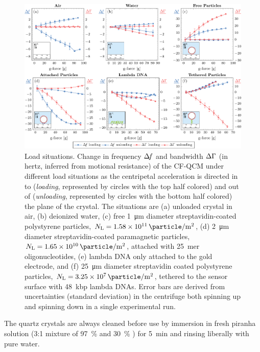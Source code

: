 \begin{figure}[ht]
\centering
\includegraphics[width=16cm,keepaspectratio]{qcm/figures/figure2.pdf}
\caption{Load situations.
Change in frequency $\Delta\!f$ and bandwidth $\Delta\Gamma$
(in hertz, inferred from motional resistance) of
the CF-QCM under different load situations as the centripetal acceleration
is directed in to (\textit{loading}, represented by circles with the top half
colored) and out of (\textit{unloading}, represented by circles with the
bottom half colored) the plane of the crystal.
The situations are
(a) unloaded crystal in air,
(b) deionized water,
(c) free \SI{1}{\micro\meter} diameter streptavidin-coated polystyrene
particles, $N_\mathrm{L}=\SI{1.58e11}{\particle\per\meter\squared}$,
(d) \SI{2}{\micro\meter} diameter streptavidin-coated paramagnetic
particles, $N_\mathrm{L}=\SI{1.65e10}{\particle\per\meter\squared}$,
attached with \SI{25}{mer} oligonucleotides,
(e) lambda DNA only attached to the gold electrode, and
(f) \SI{25}{\micro\meter} diameter streptavidin
coated polystyrene particles,
$N_\mathrm{L}=\SI{3.25e7}{\particle\per\meter\squared}$, tethered to the sensor surface with
\SI{48}{kbp} lambda DNAs.  Error bars are derived from uncertainties
(standard deviation) in the centrifuge both spinning up and spinning down in a single experimental run.}
\label{fig:loadplot}
\end{figure}
The quartz crystals are always cleaned before use by immersion
in fresh piranha solution (3:1 mixture of \SI{97}{\percent}  and
\SI{30}{\percent} ) for \SI{5}{\minute} and rinsing liberally with
pure water.

